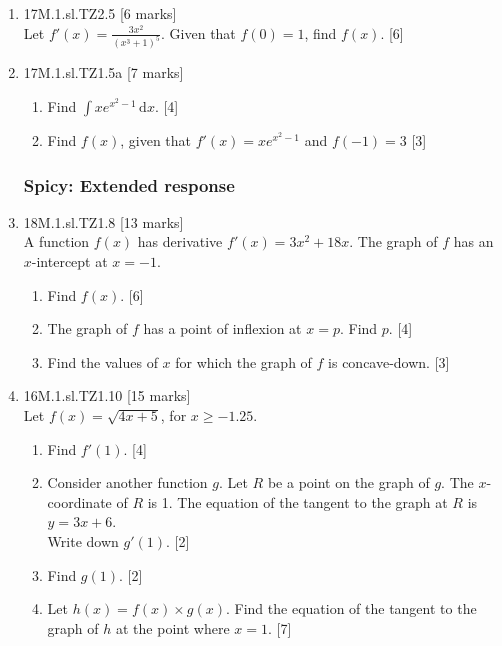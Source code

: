 \documentclass[12pt, twoside]{article}
\begin{document}
\begin{enumerate}
    \item 17M.1.sl.TZ2.5 \hfill [6 marks]\\
    Let $\displaystyle f'(x)=\frac{3x^2}{(x^3+1)^5}$. Given that $f(0)=1$, find $f(x)$. \hfill [6]

    \item 17M.1.sl.TZ1.5a \hfill [7 marks]
    \begin{enumerate}
      \item Find $\int x e^{x^2-1} \,\mathrm{d}x$. \hfill [4]
      \item Find $f(x)$, given that $f'(x) = x e^{x^2-1}$ and $f(-1)=3$ \hfill [3]
    \end{enumerate}

\subsubsection*{Spicy: Extended response}
  \item 18M.1.sl.TZ1.8 \hfill [13 marks]\\
  A function $f(x)$ has derivative $f'(x) = 3x^2 + 18x$. The graph of $f$ has an $x$-intercept at $x = -1$.
  \begin{enumerate}
    \item Find $f(x)$. \hfill [6]
    \item The graph of $f$ has a point of inflexion at $x = p$. Find $p$. \hfill [4]
    \item Find the values of $x$ for which the graph of $f$ is concave-down. \hfill [3]
  \end{enumerate}

  \item 16M.1.sl.TZ1.10 \hfill [15 marks]\\
  Let $f(x)=\sqrt{4x+5}$, for $x \geq -1.25$.
  \begin{enumerate}
    \item Find $f'(1)$. \hfill [4]
    \item Consider another function $g$. Let $R$ be a point on the graph of $g$. The $x$-coordinate of $R$ is 1. The equation of the tangent to the graph at $R$ is  $y=3x+6$.\\
    Write down $g'(1)$. \hfill [2]
    \item Find $g(1)$. \hfill [2]
    \item Let $h(x)=f(x) \times g(x)$. Find the equation of the tangent to the graph of $h$ at the point where $x=1$. \hfill [7]
  \end{enumerate}

\newpage


\end{enumerate}
\end{document}
